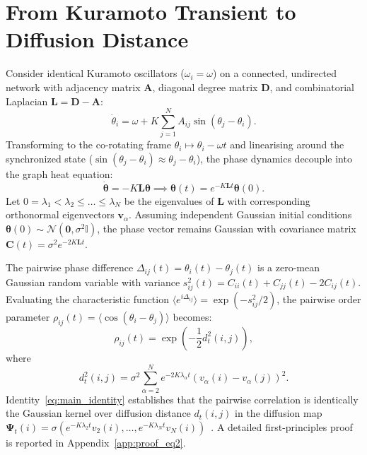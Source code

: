 \section{From Kuramoto Transient to Diffusion Distance}
\label{sec:t6_theory}
Consider identical Kuramoto oscillators ($\omega_i = \omega$) on a connected, undirected network with adjacency matrix $\mathbf{A}$, diagonal degree matrix $\mathbf{D}$, and combinatorial Laplacian $\mathbf{L} = \mathbf{D} - \mathbf{A}$:
\begin{equation}
\dot{\theta}_i = \omega + K \sum_{j=1}^N A_{ij} \sin(\theta_j - \theta_i).
\label{eq:kuramoto_eq}
\end{equation}
Transforming to the co-rotating frame $\theta_i \mapsto \theta_i - \omega t$ and linearising around the synchronized state ($\sin(\theta_j - \theta_i) \approx \theta_j - \theta_i$), the phase dynamics decouple into the graph heat equation:
\begin{equation}
\dot{\bm\theta} = -K \mathbf{L} \bm\theta \implies \bm\theta(t) = e^{-K \mathbf{L} t} \bm\theta(0).
\label{eq:linear_dynamics}
\end{equation}
Let $0 = \lambda_1 < \lambda_2 \le \dots \le \lambda_N$ be the eigenvalues of $\mathbf{L}$ with corresponding orthonormal eigenvectors $\mathbf{v}_\alpha$. Assuming independent Gaussian initial conditions $\bm\theta(0) \sim \mathcal{N}(\mathbf{0}, \sigma^2 \mathbb{I})$, the phase vector remains Gaussian with covariance matrix $\mathbf{C}(t) = \sigma^2 e^{-2K\mathbf{L}t}$. 

The pairwise phase difference $\Delta_{ij}(t) = \theta_i(t) - \theta_j(t)$ is a zero-mean Gaussian random variable with variance $s_{ij}^2(t) = C_{ii}(t) + C_{jj}(t) - 2C_{ij}(t)$. Evaluating the characteristic function $\langle e^{i \Delta_{ij}} \rangle = \exp(-s_{ij}^2/2)$, the pairwise order parameter $\rho_{ij}(t) = \langle \cos(\theta_i - \theta_j) \rangle$ becomes:
\begin{equation}
\rho_{ij}(t) = \exp\left( -\frac{1}{2} d_t^2(i,j) \right),
\label{eq:main_identity}
\end{equation}
where
\begin{equation}
d_t^2(i,j) = \sigma^2 \sum_{\alpha=2}^N e^{-2K\lambda_\alpha t} \left( v_\alpha(i) - v_\alpha(j) \right)^2.
\label{eq:diff_dist_formula}
\end{equation}
Identity~\eqref{eq:main_identity} establishes that the pairwise correlation is identically the Gaussian kernel over diffusion distance $d_t(i,j)$ in the diffusion map $\mathbf{\Psi}_t(i) = \sigma (e^{-K\lambda_2 t} v_2(i), \dots, e^{-K\lambda_N t} v_N(i))$~\cite{coifman2006}. A detailed first-principles proof is reported in Appendix~\ref{app:proof_eq2}.

